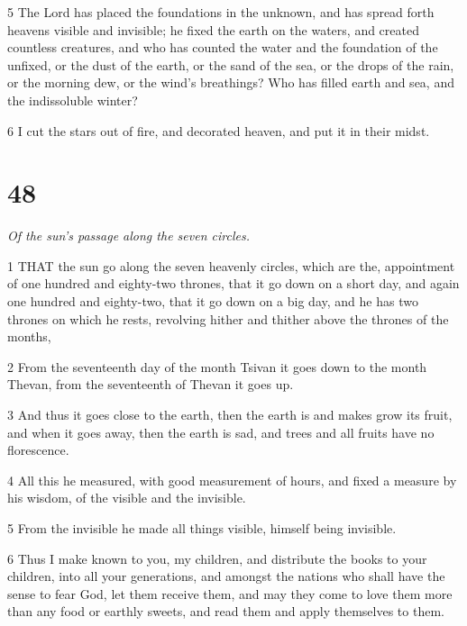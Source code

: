 \par 5 The Lord has placed the foundations in the unknown, and has spread forth heavens visible and invisible; he fixed the earth on the waters, and created countless creatures, and who has counted the water and the foundation of the unfixed, or the dust of the earth, or the sand of the sea, or the drops of the rain, or the morning dew, or the wind's breathings? Who has filled earth and sea, and the indissoluble winter?

\par 6 I cut the stars out of fire, and decorated heaven, and put it in their midst.

\chapter{48}

\par \textit{Of the sun's passage along the seven circles.}

\par 1 THAT the sun go along the seven heavenly circles, which are the, appointment of one hundred and eighty-two thrones, that it go down on a short day, and again one hundred and eighty-two, that it go down on a big day, and he has two thrones on which he rests, revolving hither and thither above the thrones of the months, 

\par 2 From the seventeenth day of the month Tsivan it goes down to the month Thevan, from the seventeenth of Thevan it goes up.

\par 3 And thus it goes close to the earth, then the earth is and makes grow its fruit, and when it goes away, then the earth is sad, and trees and all fruits have no florescence.

\par 4 All this he measured, with good measurement of hours, and fixed a measure by his wisdom, of the visible and the invisible.

\par 5 From the invisible he made all things visible, himself being invisible.

\par 6 Thus I make known to you, my children, and distribute the books to your children, into all your generations, and amongst the nations who shall have the sense to fear God, let them receive them, and may they come to love them more than any food or earthly sweets, and read them and apply themselves to them.

